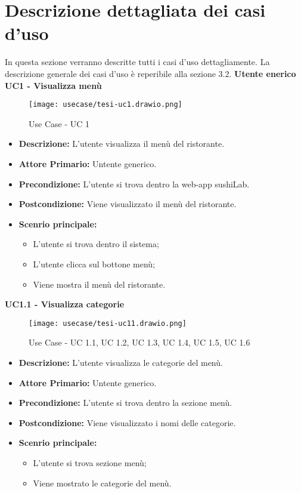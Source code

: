 
\chapter{Descrizione dettagliata dei casi d'uso}
In questa sezione verranno descritte tutti i casi d'uso dettagliamente.
La descrizione generale dei casi d'uso è reperibile alla sezione 3.2.
\textbf{Utente enerico}
\textbf{UC1 - Visualizza menù}
\begin{figure}[H]
    \centering
    \texttt{[image: usecase/tesi-uc1.drawio.png]}
    \caption{Use Case - UC 1}
\end{figure}
\begin{itemize}
    \item \textbf{Descrizione:} L'utente visualizza il menù del ristorante.
    \item \textbf{Attore Primario:} Untente generico.
    \item \textbf{Precondizione:} L'utente si trova dentro la web-app sushiLab.
    \item \textbf{Postcondizione:} Viene visualizzato il menù del ristorante.
    \item \textbf{Scenrio principale:}
    \begin{itemize}
        \item L'utente si trova dentro il sistema;
        \item L'utente clicca sul bottone menù;
        \item Viene mostra il menù del ristorante.
    \end{itemize}
\end{itemize}
\textbf{UC1.1 - Visualizza categorie}
\begin{figure}[H]
    \centering
    \texttt{[image: usecase/tesi-uc11.drawio.png]}
    \caption{Use Case - UC 1.1, UC 1.2, UC 1.3, UC 1.4, UC 1.5, UC 1.6}
\end{figure}
\begin{itemize}
    \item \textbf{Descrizione:} L'utente visualizza le categorie del menù.
    \item \textbf{Attore Primario:} Untente generico.
    \item \textbf{Precondizione:} L'utente si trova dentro la sezione menù.
    \item \textbf{Postcondizione:} Viene visualizzato i nomi delle categorie.
    \item \textbf{Scenrio principale:}
    \begin{itemize}
        \item L'utente si trova sezione menù;
        \item Viene mostrato le categorie del menù.
    \end{itemize}
\end{itemize}
